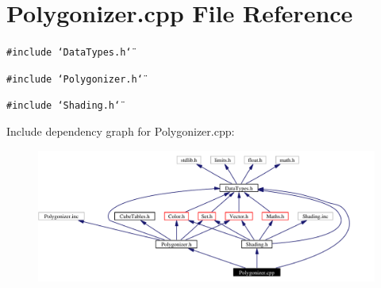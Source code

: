 \section{Polygonizer.cpp File Reference}
\label{Polygonizer_8cpp}
{\tt \#include \char`\"{}Data\-Types.h\char`\"{}}\par
{\tt \#include \char`\"{}Polygonizer.h\char`\"{}}\par
{\tt \#include \char`\"{}Shading.h\char`\"{}}\par


Include dependency graph for Polygonizer.cpp:\begin{figure}[H]
\begin{center}
\leavevmode
\includegraphics[width=327pt]{Polygonizer_8cpp__incl}
\end{center}
\end{figure}
